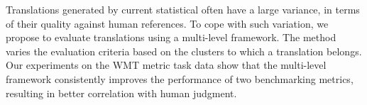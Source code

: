 Translations generated by current statistical often have a large variance, in terms of their quality against human references. To cope with such variation, we propose to evaluate translations using a multi-level framework. The method varies the evaluation criteria based on the clusters to which a translation belongs. Our experiments on the WMT metric task data show that the multi-level framework consistently improves the performance of two benchmarking metrics, resulting in better correlation with human judgment.
